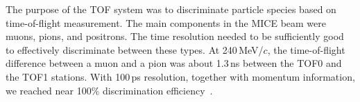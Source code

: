 

The purpose of the TOF system was to discriminate particle species
based on time-of-flight measurement. The main components in the
MICE beam were muons, pions, and positrons. The time resolution needed
to be sufficiently good to effectively discriminate between these
types. At 240\,MeV/$c$, the time-of-flight difference between a muon and
a pion was about 1.3\,ns between the TOF0 and the TOF1 stations. With 100\,ps
resolution, together with momentum information, we reached near 100\% discrimination efficiency~\cite{Bogomilov:2012sr}.



